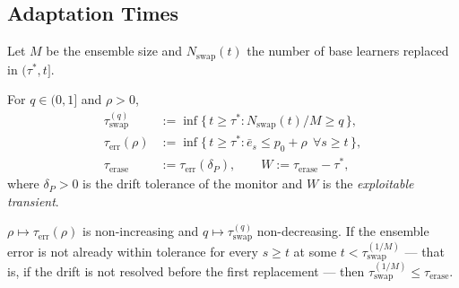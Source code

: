 \subsection{Adaptation Times}\label{sec:times}

Let $M$ be the ensemble size and $N_{\mathrm{swap}}(t)$ the number of base
learners replaced in $(\tau^*, t]$.

\begin{definition}\label{def:times}
  For $q \in (0,1]$ and $\rho > 0$,
  \begin{align*}
    \tau_{\mathrm{swap}}^{(q)} &:= \inf\{\, t \ge \tau^* :
      N_{\mathrm{swap}}(t)/M \ge q \,\}, \\
    \tau_{\mathrm{err}}(\rho) &:= \inf\{\, t \ge \tau^* :
      \bar{e}_s \le p_0 + \rho \ \ \forall s \ge t \,\}, \\
    \tau_{\mathrm{erase}} &:= \tau_{\mathrm{err}}(\delta_P), \qquad
    W := \tau_{\mathrm{erase}} - \tau^*,
  \end{align*}
  where $\delta_P > 0$ is the drift tolerance of the monitor and $W$ is the
  \emph{exploitable transient}.
\end{definition}

\begin{proposition}[Ordering]\label{prop:order}
  $\rho \mapsto \tau_{\mathrm{err}}(\rho)$ is non-increasing and
  $q \mapsto \tau_{\mathrm{swap}}^{(q)}$ non-decreasing. If the ensemble error is
  not already within tolerance for every $s \ge t$ at some
  $t < \tau_{\mathrm{swap}}^{(1/M)}$ --- that is, if the drift is not resolved
  before the first replacement --- then
  $\tau_{\mathrm{swap}}^{(1/M)} \le \tau_{\mathrm{erase}}$.
\end{proposition}

